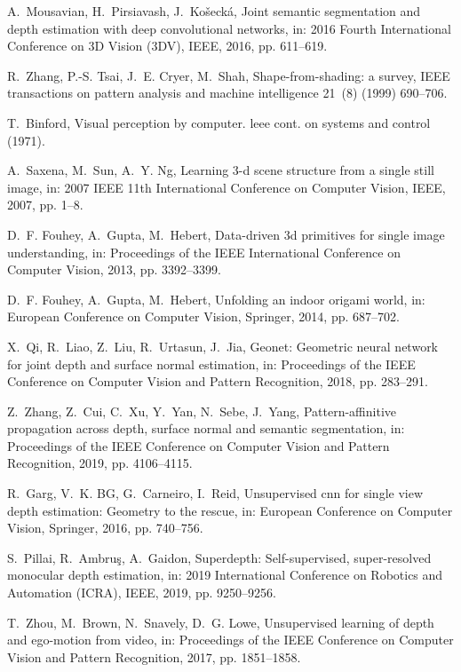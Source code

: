 \documentclass[5p]{elsarticle}
\begin{document}
\begin{thebibliography}{100}
A.~Mousavian, H.~Pirsiavash, J.~Ko{\v{s}}eck{\'a}, Joint semantic segmentation
  and depth estimation with deep convolutional networks, in: 2016 Fourth
  International Conference on 3D Vision (3DV), IEEE, 2016, pp. 611--619.

R.~Zhang, P.-S. Tsai, J.~E. Cryer, M.~Shah, Shape-from-shading: a survey, IEEE
  transactions on pattern analysis and machine intelligence 21~(8) (1999)
  690--706.

T.~Binford, Visual perception by computer. leee cont. on systems and control
  (1971).

A.~Saxena, M.~Sun, A.~Y. Ng, Learning 3-d scene structure from a single still
  image, in: 2007 IEEE 11th International Conference on Computer Vision, IEEE,
  2007, pp. 1--8.

D.~F. Fouhey, A.~Gupta, M.~Hebert, Data-driven 3d primitives for single image
  understanding, in: Proceedings of the IEEE International Conference on
  Computer Vision, 2013, pp. 3392--3399.

D.~F. Fouhey, A.~Gupta, M.~Hebert, Unfolding an indoor origami world, in:
  European Conference on Computer Vision, Springer, 2014, pp. 687--702.

X.~Qi, R.~Liao, Z.~Liu, R.~Urtasun, J.~Jia, Geonet: Geometric neural network
  for joint depth and surface normal estimation, in: Proceedings of the IEEE
  Conference on Computer Vision and Pattern Recognition, 2018, pp. 283--291.

Z.~Zhang, Z.~Cui, C.~Xu, Y.~Yan, N.~Sebe, J.~Yang, Pattern-affinitive
  propagation across depth, surface normal and semantic segmentation, in:
  Proceedings of the IEEE Conference on Computer Vision and Pattern
  Recognition, 2019, pp. 4106--4115.

R.~Garg, V.~K. BG, G.~Carneiro, I.~Reid, Unsupervised cnn for single view depth
  estimation: Geometry to the rescue, in: European Conference on Computer
  Vision, Springer, 2016, pp. 740--756.

S.~Pillai, R.~Ambru{\c{s}}, A.~Gaidon, Superdepth: Self-supervised,
  super-resolved monocular depth estimation, in: 2019 International Conference
  on Robotics and Automation (ICRA), IEEE, 2019, pp. 9250--9256.

T.~Zhou, M.~Brown, N.~Snavely, D.~G. Lowe, Unsupervised learning of depth and
  ego-motion from video, in: Proceedings of the IEEE Conference on Computer
  Vision and Pattern Recognition, 2017, pp. 1851--1858.


\end{thebibliography}
\end{document}
